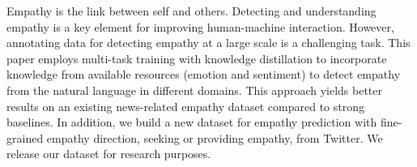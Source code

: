Empathy is the link between self and others. Detecting and understanding empathy is a key element for improving human-machine interaction.  However, annotating data for detecting empathy at a large scale is a challenging task. This paper employs multi-task training with knowledge distillation to incorporate knowledge from available resources (emotion and sentiment) to detect empathy from the natural language in different domains. This approach yields better results on an existing news-related empathy dataset compared to strong baselines. In addition, we build a new dataset for empathy prediction with fine-grained empathy direction, seeking or providing empathy, from Twitter.  We release our dataset for research purposes.
